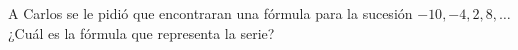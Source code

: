 A Carlos se le pidió que encontraran una fórmula para la sucesión $-10,-4,2,8, \dots$
¿Cu\'al es la f\'ormula que representa la serie? \fillin[$-10+6(n-1)$]
